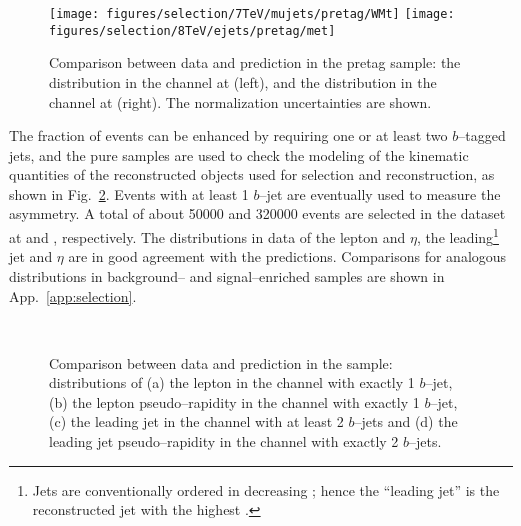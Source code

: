 \begin{figure}\centering
  \texttt{[image: figures/selection/7TeV/mujets/pretag/WMt]}
  \texttt{[image: figures/selection/8TeV/ejets/pretag/met]}
  \caption{
    Comparison between data and prediction in the pretag sample: the
    \mtw{} distribution in the \mujets{} channel at \seventev{}
    (left), and the \met{} distribution in the \ejets{} channel at
    \eighttev{} (right). The normalization uncertainties are shown.}
  \label{fig:pretagdatamc}
\end{figure}

The fraction of \ttbar{} events can be enhanced by requiring one or
at least two $b$--tagged jets, and the pure samples are used to check the
modeling of the kinematic quantities of the reconstructed
objects used for selection and reconstruction, as shown in
Fig.~\ref{fig:taggeddatamc}. Events with at least 1 $b$--jet are
eventually used to measure the asymmetry. A total of about 50000 and
320000 \ttbar{} events are selected in the dataset at \seventev{} and
\eighttev{}, respectively.
The distributions in data of the lepton \pt{} and $\eta$, the
leading\footnote{Jets are conventionally ordered in decreasing \pt{};
  hence the ``leading jet'' is the reconstructed jet with the highest
  \pt{}.} jet \pt{} and $\eta$ are in good agreement with the
predictions. Comparisons for analogous distributions in background-- and
signal--enriched samples are shown in App.~\ref{app:selection}.

\begin{figure}\centering
  \quad
  \\
  \quad
  \caption{
    Comparison between data and prediction in the \eighttev{} sample:
    distributions of (a) the lepton \pt{} in the \mujets{} channel with
    exactly 1 $b$--jet, (b) the lepton pseudo--rapidity in the \ejets{}
    channel with exactly 1 $b$--jet, (c) the leading jet \pt{} in the
    \mujets{} channel with at least 2 $b$--jets and (d) the leading
    jet pseudo--rapidity in the \ejets{} channel with exactly 2
    $b$--jets.
}
  \label{fig:taggeddatamc}
\end{figure}

